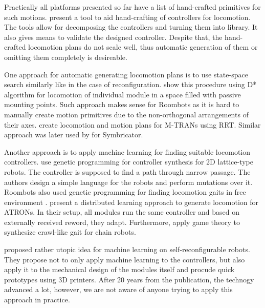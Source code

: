 Practically all platforms presented so far have a list of hand-crafted
primitives for such motions. \textcite{DBLP:conf/isrr/TosunJKY15} present a tool
to aid hand-crafting of controllers for locomotion. The tools allow for
decomposing the controllers and turning them into library. It also gives means
to validate the designed controller. Despite that, the hand-crafted locomotion
plans do not scale well, thus automatic generation of them or omitting them
completely is desireable.

One approach for automatic generating locomotion plans is to use state-space
search similarly like in the case of reconfiguration.
\textcite{DBLP:conf/robotik/BonardiMSVI12} show this procedure using D*
algorithm for locomotion of individual module in a space filled with passive
mounting points. Such approach makes sense for Roombots as it is hard to
manually create motion primitives due to the non-orthogonal arrangements of
their axes. \textcite{DBLP:conf/dars/YoshidaKKMTK04} create locomotion and
motion plans for M-TRANs using RRT. Similar approach was later used by
\textcite{DBLP:conf/taros/VonasekKP12} for Symbricator.

Another approach is to apply machine learning for finding suitable locomotion
controllers. \textcite{DBLP:conf/eh/BennettR00} use genetic programming for
controller synthesis for 2D lattice-type robots. The controller is supposed to
find a path through narrow passage. The authors design a simple language for the
robots and perform mutations over it. Roombots also used genetic programming for
finding locomotion gaits in free environment \cite{aydn_2010,
DBLP:journals/procedia/PouyaAMI11}. \textcite{DBLP:journals/ras/ChristensenSS13}
present a distributed learning approach to generate locomotion for ATRONs. In
their setup, all modules run the same controller and based on externally
received reword, they adapt. Furthermore, \textcite{DBLP:conf/iros/DuttaDN17}
apply game theory to synthesize crawl-like gait for chain robots.

\textcite{DBLP:conf/icra/LipsonP00} proposed rather utopic idea for machine
learning on self-reconfigurable robots. They propose not to only apply machine
learning to the controllers, but also apply it to the mechanical design of the
modules itself and procude quick prototypes using 3D printers. After 20 years
from the publication, the technogy advanced a lot, however, we are not aware of
anyone trying to apply this approach in practice.

